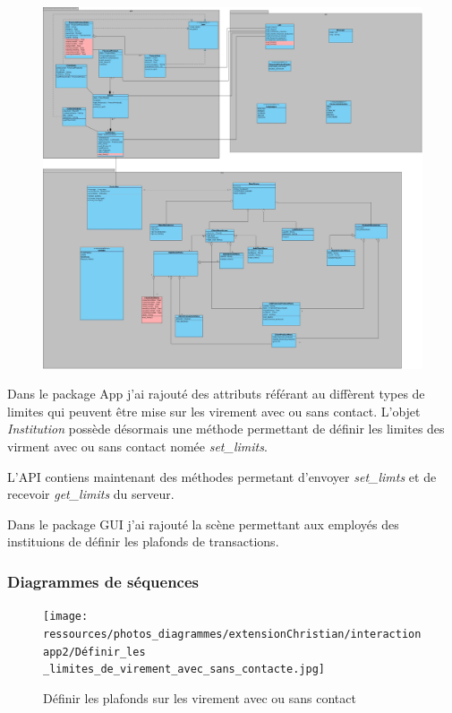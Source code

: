\documentclass[../rapport.tex]{subfiles}
\begin{document}
				\begin{figure}[h]
						\centering\includegraphics[scale=0.15]{ressources/photos_diagrammes/extensionChristian/classapp2/ClassDiagram.jpg}
				\end{figure}
		Dans le package App j'ai rajouté des attributs référant au diffèrent types de limites qui peuvent être mise sur les virement avec ou sans contact.
        L'objet \textit{Institution} possède désormais une méthode permettant de définir les limites des virment avec ou sans contact nomée \textit{set_limits}.

		\bigskip

		L'API contiens maintenant des méthodes permetant d'envoyer \textit{set_limts} et de recevoir \textit{get_limits}
        du serveur.

		\bigskip

        Dans le package GUI j'ai rajouté la scène permettant aux employés des instituions de définir les plafonds de transactions.
		\medskip

\newpage
		\subsubsection{Diagrammes de séquences}
				\begin{figure}[h]
						\centering\texttt{[image: ressources/photos\_diagrammes/extensionChristian/interactionapp2/Définir\_les \_limites\_de\_virement\_avec\_sans\_contacte.jpg]}
						\caption{Définir les plafonds sur les virement avec ou sans contact}
				\end{figure}
\end{document}
